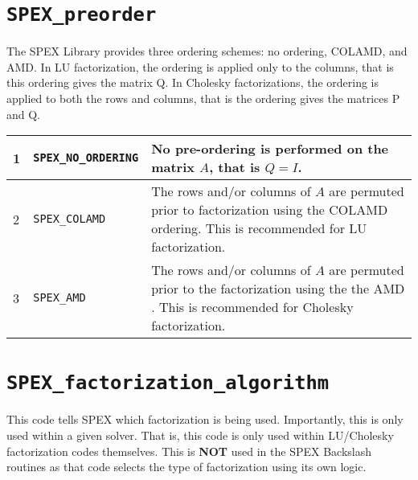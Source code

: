 \documentclass[12pt]{report}
\theoremstyle{definition}
\begin{document}
\section{\texttt{SPEX\_preorder}} \label{ss:SPEX_preorder}

The SPEX Library provides three ordering schemes: no ordering, COLAMD, and AMD. In LU factorization, the ordering is applied only to the columns, that is this ordering gives the matrix Q. In Cholesky factorizations, the ordering is applied to both the rows and columns, that is the ordering gives the matrices P and Q.

{\small
\begin{center}
\begin{tabular}{llp{4in}}
\hline
1 & \verb|SPEX_NO_ORDERING| & No pre-ordering is performed on the matrix $A$,
                              that is $Q = I$. \\
\hline
2 & \verb|SPEX_COLAMD|      & The rows and/or columns of $A$ are permuted prior to
                              factorization using the COLAMD
                              \cite{davis2004algorithmcolamd} ordering.
                              This is recommended for LU factorization. \\
\hline
3 & \verb|SPEX_AMD|         & The rows and/or columns of $A$ are permuted prior 
                              to the factorization using the the AMD
                             \cite{amestoy2004algorithmamd}.
                             This is recommended for Cholesky factorization. \\
\hline
\end{tabular}
\end{center}
}

\section{\texttt{SPEX\_factorization\_algorithm}} \label{ss:SPEX_factorization_algorithm}

This code tells SPEX which factorization is being used. Importantly, this is only used within a given solver. That is, this code is only used within LU/Cholesky factorization codes themselves. This is \textbf{NOT} used in the SPEX Backslash routines as that code selects the type of factorization using its own logic.
\end{document}
